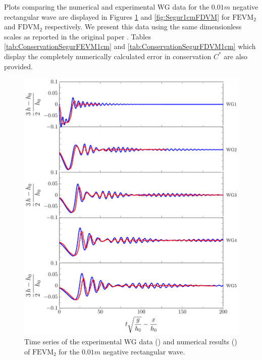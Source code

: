 Plots comparing the numerical and experimental WG data for the $0.01m$ negative rectangular wave are displayed in Figures \ref{fig:Segur1cmFEVM} and \ref{fig:Segur1cmFDVM} for $\text{FEVM}_2$ and $\text{FDVM}_2$ respectively. We present this data using the same dimensionless scales as reported in the original paper \cite{Hammack-Segur-1978-337}. Tables \ref{tab:ConservationSegurFEVM1cm} and \ref{tab:ConservationSegurFDVM1cm} which display the completely numerically calculated error in conservation $C^*$ are also provided. 
\begin{figure}
	\centering
	\includegraphics[width=\textwidth]{./chp6/figures/Experiment/Segur/LongWGsFEVM1cm.pdf}
	\caption{Time series of the experimental WG data ({\color{red}\solidrule}) and numerical results ({\color{blue}\solidrule}) of $\text{FEVM}_2$ for the $0.01m$ negative rectangular wave.}
	\label{fig:Segur1cmFEVM}
\end{figure}
